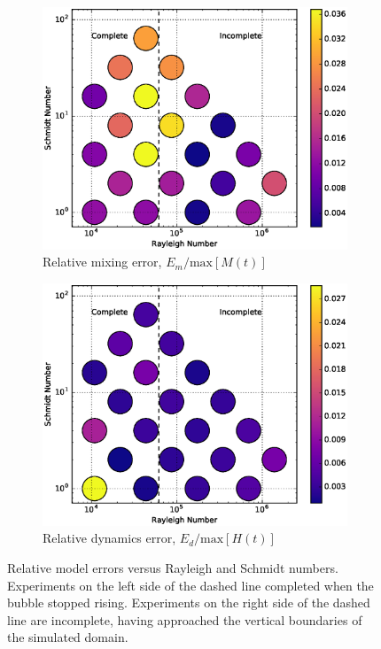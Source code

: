 \begin{figure}
\begin{subfigure}[b]{\columnwidth}
\includegraphics[width=\columnwidth]{figs/MixingError-vs-Rayleigh-Schmidt}
\caption{Relative mixing error, $E_m/\text{max}[M(t)]$}
\end{subfigure}
\begin{subfigure}[b]{\columnwidth}
\includegraphics[width=\columnwidth]{figs/DynamicsError-vs-Rayleigh-Schmidt}
\caption{Relative dynamics error, $E_d/\text{max}[H(t)]$}
\end{subfigure}
\caption{ 
  Relative model errors versus Rayleigh and Schmidt numbers.
  Experiments on the left side of the dashed line completed when the bubble stopped rising.
  Experiments on the right side of the dashed line are incomplete, having approached the vertical boundaries of the simulated domain.
}
\end{figure}

